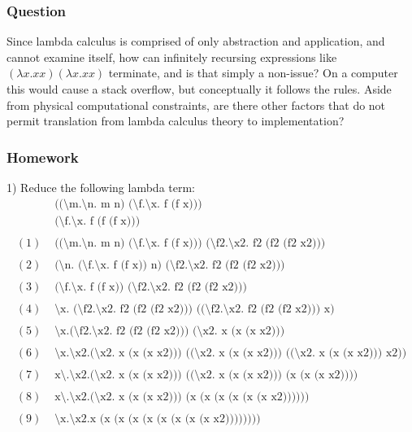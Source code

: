 \documentclass{article}
\theoremstyle{theorem}
\theoremstyle{definition}
\theoremstyle{remark}
\begin{document}
\subsubsection*{Question} Since lambda calculus is comprised of only abstraction and application, and cannot examine itself, how can infinitely recursing expressions like $(\lambda x.xx)(\lambda x.xx)$ terminate, and is that simply a non-issue? On a computer this would cause a stack overflow, but conceptually it follows the rules. Aside from physical computational constraints, are there other factors that do not permit translation from lambda calculus theory to implementation?

\subsubsection*{Homework}

1) Reduce the following lambda term:\\
\[
\begin{aligned}
  & \text{  ((\textbackslash m.\textbackslash n. m n) (\textbackslash f.\textbackslash x. f (f x))) }\\
  & \text{  (\textbackslash f.\textbackslash x. f (f (f x))) }\\
  \\
  (1)& \text{   ((\textbackslash m.\textbackslash n. m n) (\textbackslash f.\textbackslash x. f (f x))) (\textbackslash f2.\textbackslash x2. f2 (f2 (f2 x2)))}\\
  \\
  (2)& \text{   (\textbackslash n. (\textbackslash f.\textbackslash x. f (f x)) n) (\textbackslash f2.\textbackslash x2. f2 (f2 (f2 x2)))}\\
  \\
  (3)& \text{   (\textbackslash f.\textbackslash x. f (f x)) (\textbackslash f2.\textbackslash x2. f2 (f2 (f2 x2)))}\\
  \\
  (4)& \text{   \textbackslash x. (\textbackslash f2.\textbackslash x2. f2 (f2 (f2 x2))) ((\textbackslash f2.\textbackslash x2. f2 (f2 (f2 x2))) x)}\\
  \\
  (5)& \text{   \textbackslash x.(\textbackslash f2.\textbackslash x2. f2 (f2 (f2 x2))) (\textbackslash x2. x (x (x x2)))}\\
  \\
  (6)& \text{   \textbackslash x.\textbackslash x2.(\textbackslash x2. x (x (x x2))) ((\textbackslash x2. x (x (x x2))) ((\textbackslash x2. x (x (x x2))) x2))}\\
  \\
  (7)& \text{   x\textbackslash .\textbackslash x2.(\textbackslash x2. x (x (x x2))) ((\textbackslash x2. x (x (x x2))) (x (x (x x2))))}\\
  \\
  (8)& \text{   x\textbackslash .\textbackslash x2.(\textbackslash x2. x (x (x x2))) (x (x (x (x (x (x x2))))))}\\
  \\
  (9)& \text{   \textbackslash x.\textbackslash x2.x (x (x (x (x (x (x (x (x x2))))))))}\\
\end{aligned}
\]
\end{document}
